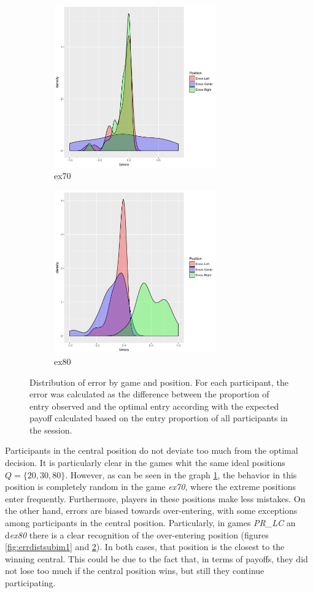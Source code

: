 \begin{figure}[h]
	\begin{subfigure}{0.5\textwidth}
	\includegraphics[width=1\linewidth, height=7cm]{../../results/figures/errorDistributionex70} 
	\caption{ex70}
	\label{fig:errdistsubim5}
	\end{subfigure}
	\begin{subfigure}{0.5\textwidth}
	\includegraphics[width=1\linewidth, height=7cm]{../../results/figures/errorDistributionex80}
	\caption{ex80}
	\label{fig:errdistsubim6}
	\end{subfigure}
	
	\caption{Distribution of error by game and position. For each participant, the error was calculated as the difference between the proportion of entry observed and the optimal entry according with the expected payoff calculated based on the entry proportion of all participants in the session.}
	\label{fig:errordist}
\end{figure}


Participants in the central position do not deviate too much from the optimal decision. It is particularly clear in the games whit the same ideal positions $Q=\{20, 30, 80\}$. However, as can be seen in the graph \ref{fig:errdistsubim5}, the behavior in this position is completely random in the game \emph{ex70}, where the extreme positions enter frequently. Furthermore, players in these positions make less mistakes. On the other hand, errors are biased towards over-entering, with some exceptions among participants in the central position. Particularly, in games \emph{PR\_LC} an d\emph{ex80} there is a clear recognition of the over-entering position (figures \ref{fig:errdistsubim1} and \ref{fig:errdistsubim6}). In both cases, that position is the closest to the winning central. This could be due to the fact that, in terms of payoffs, they did not lose too much if the central position wins, but still they continue participating. 

